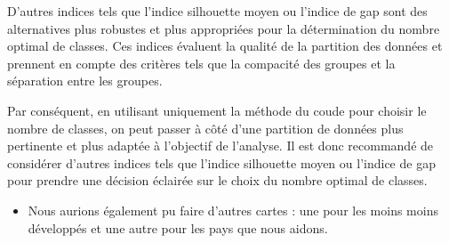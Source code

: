 \documentclass[
]{article}
\providecommand{\tightlist}{%
  \setlength{\itemsep}{0pt}\setlength{\parskip}{0pt}}
\begin{document}
D'autres indices tels que l'indice silhouette moyen ou l'indice de gap
sont des alternatives plus robustes et plus appropriées pour la
détermination du nombre optimal de classes. Ces indices évaluent la
qualité de la partition des données et prennent en compte des critères
tels que la compacité des groupes et la séparation entre les groupes.

Par conséquent, en utilisant uniquement la méthode du coude pour choisir
le nombre de classes, on peut passer à côté d'une partition de données
plus pertinente et plus adaptée à l'objectif de l'analyse. Il est donc
recommandé de considérer d'autres indices tels que l'indice silhouette
moyen ou l'indice de gap pour prendre une décision éclairée sur le choix
du nombre optimal de classes.

\begin{itemize}
\tightlist
\item
  Nous aurions également pu faire d'autres cartes : une pour les moins
  moins développés et une autre pour les pays que nous aidons.
\end{itemize}
\end{document}
